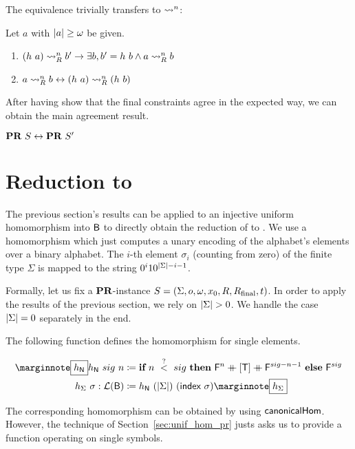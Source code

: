 The equivalence trivially transfers to $\rightsquigarrow_{}^n$: 
\begin{proposition}
  Let $a$ with $|a| \ge \omega$ be given.
  \begin{enumerate}
    \item $(h~a) \rightsquigarrow_{R}^n b' \rightarrow \exists b, b' = h~b \land a \rightsquigarrow_{R}^n b$
    \item $a \rightsquigarrow_{R}^n b \leftrightarrow (h~a) \rightsquigarrow_{R}^n (h~b)$
\end{enumerate}
\end{proposition}


After having show that the final constraints agree in the expected way, we can obtain the main agreement result.
\begin{theorem}\label{thm:hom_pr_equiv}
  $\textbf{PR}{}~S \leftrightarrow \textbf{PR}{}~S'$
\end{theorem}

\section{Reduction to \BPR{}}
The previous section's results can be applied to an injective uniform homomorphism into $\textsf{B}$ to directly obtain the reduction of \PR{} to \BPR{}. 
We use a homomorphism which just computes a unary encoding of the alphabet's elements over a binary alphabet. The $i$-th element $\sigma_i$ (counting from zero) of the finite type $\Sigma$ is mapped to the string $0^i10^{|\Sigma|-i-1}$.

Formally, let us fix a $\textbf{PR}{}$-instance $S = (\Sigma, o, \omega, x_0, R, R_{\text{final}}, t)$. In order to apply the results of the previous section, we rely on $|\Sigma| > 0$. We handle the case $|\Sigma| = 0$ separately in the end.

The following function defines the homomorphism for single elements. 
\begin{definition}\label{def:hnat_hsig}
  \begin{align*}
    \mnote{$h_{\nat}$}
    h_{\nat}~sig~n&\defeq \ITE{n~\overset{?}{<}~sig}{\bfalse^n \concat [\btrue] \concat \bfalse^{sig -n -1}}{\bfalse^{sig}} \\
    h_{\Sigma}~\sigma : \listsof{\bool} &\defeq h_{\nat}~(\length{\Sigma})~(\textsf{index}~\sigma)\mnote{$h_\Sigma$}
  \end{align*}
\end{definition}
The corresponding homomorphism can be obtained by using $\textsf{canonicalHom}$. However, the technique of Section~\ref{sec:unif_hom_pr} justs asks us to provide a function operating on single symbols.

